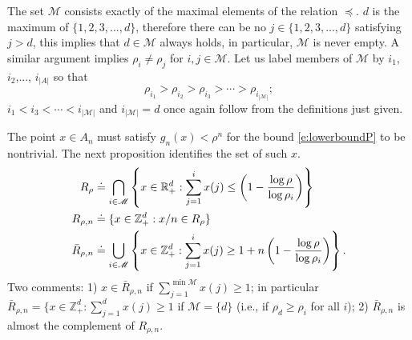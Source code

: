 \documentclass[11pt,a4paper]{article}
\begin{document}
The set ${\mathscr M}$ consists exactly of the maximal elements of the relation
$\preccurlyeq$.
$d$ is the maximum of $\{1,2,3,...,d\}$, therefore there can be 
no $j \in \{1,2,3,...,d\}$ satisfying $j > d$, this implies that 
$d \in {\mathscr M}$
always holds, in particular, ${\mathscr M}$ is never empty.
A similar argument implies
$\rho_i \neq \rho_j$ for $i,j \in {\mathscr M}$. Let us label members of ${\mathscr M}$ by
$i_1$, $i_2$,..., $i_{|A|}$ so that 
\begin{equation}\label{e:rhos}
\rho_{i_1} > 
\rho_{i_2} > 
\rho_{i_3} > \cdots >\rho_{i_{|{\mathscr M}|}};
\end{equation}
$i_1  < i_3 <\cdots < i_{|{\mathscr M}|}$ and $i_{|{\mathscr M}|} = d$  once again follow 
from the definitions just given.

The point $x \in A_n$ must satisfy $g_n(x) < \rho^n$ for 
the bound \eqref{e:lowerboundP} to be nontrivial. 
The next proposition identifies the set of such $x$.
\begin{align}
R_\rho &\doteq  \label{d:Rrho}
\bigcap_{i \in {\mathscr M} } \left\{x \in {\mathbb R}^d_+: \sum_{j=1}^{i} x(j) \le  \left(1 - \frac{\log \rho}{\log \rho_i}\right) \right\}\\
R_{\rho,n} &\doteq \{x \in {\mathbb Z}_+^d: x/n \in R_\rho \} \notag \\
\bar{R}_{\rho,n} &\doteq \notag
\bigcup_{i \in {\mathscr M} } \left\{x \in {\mathbb Z}^d_+: \sum_{j=1}^{i} x(j) \ge 1+ n\left(1 - \frac{\log \rho}{\log \rho_i}\right) \right\}.
\end{align}
Two comments: 1) $x \in \bar{R}_{\rho,n}$ if 
$\sum_{j=1}^{\min {\mathscr M} } x(j) \ge 1$;
in particular $\bar{R}_{\rho,n} = 
\{x \in{\mathbb Z}_+^d: \sum_{j=1}^{d} x(j) \ge 1$ if
${\mathscr M} = \{d\}$ (i.e., if $\rho_d \ge \rho_i$ for all $i$);
2) $\bar{R}_{\rho,n}$ is almost the complement of $R_{\rho,n}$.
\end{document}
